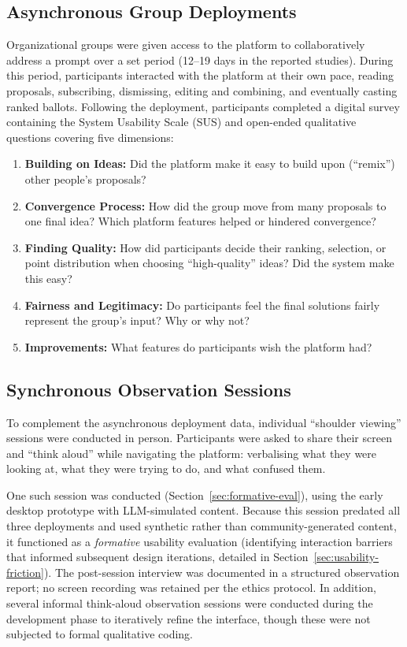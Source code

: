 \documentclass[a4paper, 12pt, twoside]{iviathesis}
\begin{document}
\subsection{Asynchronous Group Deployments}
\label{sec:method-a}
Organizational groups were given access to the platform to collaboratively address a prompt over a set period (12--19 days in the reported studies). During this period, participants interacted with the platform at their own pace, reading proposals, subscribing, dismissing, editing and combining, and eventually casting ranked ballots. Following the deployment, participants completed a digital survey containing the System Usability Scale (SUS) \cite{brooke1996sus} and open-ended qualitative questions covering five dimensions:
\begin{enumerate}
    \item \textbf{Building on Ideas:} Did the platform make it easy to build upon (``remix'') other people's proposals?
    \item \textbf{Convergence Process:} How did the group move from many proposals to one final idea? Which platform features helped or hindered convergence?
    \item \textbf{Finding Quality:} How did participants decide their ranking, selection, or point distribution when choosing ``high-quality'' ideas? Did the system make this easy?
    \item \textbf{Fairness and Legitimacy:} Do participants feel the final solutions fairly represent the group's input? Why or why not?
    \item \textbf{Improvements:} What features do participants wish the platform had?
\end{enumerate}

\subsection{Synchronous Observation Sessions}
\label{sec:method-b}
To complement the asynchronous deployment data, individual ``shoulder viewing'' sessions were conducted in person. Participants were asked to share their screen and ``think aloud'' \cite{ericsson1993protocol} while navigating the platform: verbalising what they were looking at, what they were trying to do, and what confused them.

One such session was conducted (Section~\ref{sec:formative-eval}), using the early desktop prototype with LLM-simulated content. Because this session predated all three deployments and used synthetic rather than community-generated content, it functioned as a \textit{formative} usability evaluation (identifying interaction barriers that informed subsequent design iterations, detailed in Section~\ref{sec:usability-friction}). The post-session interview was documented in a structured observation report; no screen recording was retained per the ethics protocol. In addition, several informal think-aloud observation sessions were conducted during the development phase to iteratively refine the interface, though these were not subjected to formal qualitative coding.
\end{document}
